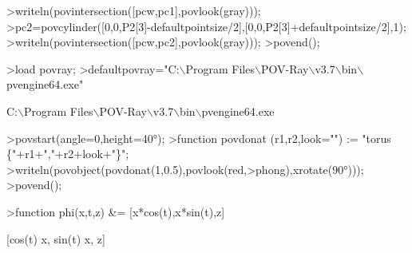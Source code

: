 \documentclass[a4paper,10pt]{article}
\begin{document}
\begin{eulernotebook}
\begin{eulercomment}
\begin{eulercomment}
\begin{eulerprompt}
>writeln(povintersection([pcw,pc1],povlook(gray)));
>pc2=povcylinder([0,0,P2[3]-defaultpointsize/2],[0,0,P2[3]+defaultpointsize/2],1);
>writeln(povintersection([pcw,pc2],povlook(gray)));
>povend();
\end{eulerprompt}
\begin{eulerprompt}
>load povray;
>defaultpovray="C:\(\backslash\)Program Files\(\backslash\)POV-Ray\(\backslash\)v3.7\(\backslash\)bin\(\backslash\)pvengine64.exe"
\end{eulerprompt}
\begin{euleroutput}
  C:\(\backslash\)Program Files\(\backslash\)POV-Ray\(\backslash\)v3.7\(\backslash\)bin\(\backslash\)pvengine64.exe
\end{euleroutput}
\begin{eulerprompt}
>povstart(angle=0,height=40°);
>function povdonat (r1,r2,look="") := "torus \{"+r1+","+r2+look+"\}";
>writeln(povobject(povdonat(1,0.5),povlook(red,>phong),xrotate(90°)));
>povend();
\end{eulerprompt}
\begin{eulerprompt}
>function phi(x,t,z) &= [x*cos(t),x*sin(t),z]
\end{eulerprompt}
\begin{euleroutput}
  
                         [cos(t) x, sin(t) x, z]
  

\end{euleroutput}
\end{eulercomment}
\end{eulercomment}
\end{eulernotebook}
\end{document}
